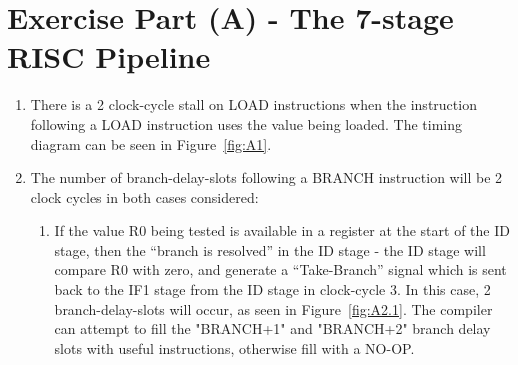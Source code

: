 \section*{Exercise Part (A) - The 7-stage RISC Pipeline}

\begin{enumerate}[wide, label=(A\arabic*)]

\item  There is a 2 clock-cycle stall on LOAD instructions when the instruction following a LOAD instruction uses the value being loaded. The timing diagram can be seen in Figure~\ref{fig:A1}.

\item The number of branch-delay-slots following a BRANCH instruction will be 2 clock cycles in both cases considered:
\begin{enumerate}[wide, label=\arabic*.]
\item If the value R0 being tested is available in a register at the start of the ID stage, then the “branch is resolved” in the ID stage - the ID stage will compare R0 with zero, and generate a “Take-Branch” signal which is sent back to the IF1 stage from the ID stage in clock-cycle 3. In this case, 2 branch-delay-slots will occur, as seen in Figure~\ref{fig:A2.1}. The compiler can attempt to fill the "BRANCH+1" and "BRANCH+2" branch delay slots with useful instructions, otherwise fill with a NO-OP. 


\end{enumerate}
\end{enumerate}
